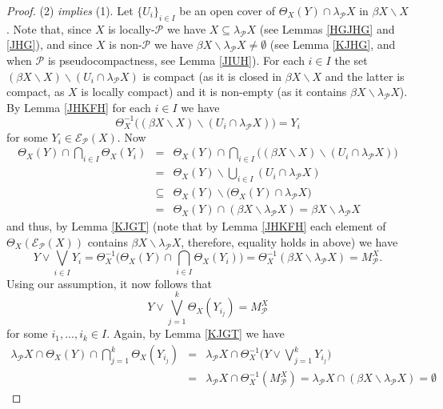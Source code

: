 \documentclass{amsart}
\theoremstyle{definition}
\theoremstyle{remark}
\theoremstyle{notation}
\numberwithin{equation}{section}
\begin{document}
\begin{proof}
(2) {\em  implies} (1).  Let  $\{U_i\}_{i\in I}$  be an open cover of $\Theta_X(Y)\cap\lambda_{{\mathcal P}} X$
in $\beta X\backslash X$. Note that, since $X$  is locally-${\mathcal P}$ we have $X\subseteq\lambda_{{\mathcal P}} X$
(see Lemmas \ref{HGJHG} and \ref{JHG}), and since $X$ is non-${\mathcal P}$ we have $\beta X\backslash\lambda_{{\mathcal P}} X\neq\emptyset$
(see Lemma \ref{KJHG}, and  when ${\mathcal P}$ is pseudocompactness,
see Lemma \ref{JIUH}). For each $i\in I$ the set $(\beta X\backslash X)\backslash(U_i\cap\lambda_{{\mathcal P}} X)$ is compact (as it is closed in  $\beta X\backslash X$ and the latter is compact, as  $X$ is locally compact) and  it is non-empty (as it contains
$\beta X\backslash\lambda_{{\mathcal P}} X$). By Lemma  \ref{JHKFH} for each $i\in I$ we have
\[\Theta_X^{-1}\big((\beta X\backslash X)\backslash(U_i\cap\lambda_{{\mathcal P}} X)\big)=Y_i\]
for some $Y_i\in{\mathscr E}_{{\mathcal P}}(X)$. Now
\begin{eqnarray*}
\Theta_X(Y)\cap\bigcap_{i\in I}\Theta_X(Y_i)&=&\Theta_X(Y)\cap\bigcap_{i\in I}\big((\beta X\backslash X)
\backslash(U_i\cap\lambda_{{\mathcal P}} X)\big)\\&=&\Theta_X(Y)\backslash\bigcup_{i\in I}(U_i\cap\lambda_{{\mathcal P}} X)\\&\subseteq&\Theta_X(Y)
\backslash\big(\Theta_X(Y)\cap\lambda_{{\mathcal P}} X\big)\\&=&\Theta_X(Y)\cap(\beta X\backslash\lambda_{{\mathcal P}} X)=\beta X\backslash\lambda_{{\mathcal P}} X
\end{eqnarray*}
and thus,  by Lemma \ref{KJGT} (note that by Lemma  \ref{JHKFH} each
element of $\Theta_X({\mathscr E}_{{\mathcal P}}(X))$ contains $\beta X\backslash\lambda_{{\mathcal P}} X$, therefore,  equality holds in above) we have
\[Y\vee\bigvee_{i\in I}Y_i=\Theta_X^{-1}\Big(\Theta_X(Y)\cap\bigcap_{i\in I}\Theta_X(Y_i)\Big)=\Theta_X^{-1}(\beta X\backslash\lambda_{{\mathcal P}} X)
=M^X_{{\mathcal P}}.\]
Using our assumption, it now  follows that
\[Y\vee \bigvee_{j=1}^k\Theta_X(Y_{i_j})=M^X_{{\mathcal P}}\]
for some $i_1,\ldots,i_k\in I$. Again, by Lemma \ref{KJGT} we have
\begin{eqnarray*}
\lambda_{{\mathcal P}} X\cap\Theta_X(Y)\cap\bigcap_{j=1}^k\Theta_X(Y_{i_j})&=&\lambda_{{\mathcal P}} X\cap\Theta_X^{-1}\Big(Y\vee \bigvee_{j=1}^kY_{i_j}\Big)
\\&=&\lambda_{{\mathcal P}} X\cap\Theta_X^{-1}(M^X_{{\mathcal P}})=\lambda_{{\mathcal P}} X\cap(\beta X\backslash\lambda_{{\mathcal P}} X)=\emptyset
\end{eqnarray*}

\end{proof}
\end{document}
